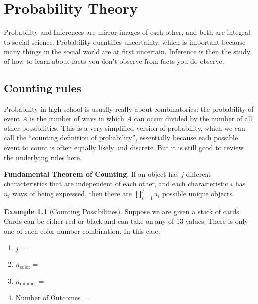 \documentclass[
]{book}
\theoremstyle{definition}
\theoremstyle{definition}
\newtheorem{example}{Example}[chapter]
\theoremstyle{definition}
\theoremstyle{definition}
\theoremstyle{remark}
\begin{document}
\hypertarget{probability-theory}{%
\chapter{Probability Theory}\label{probability-theory}}

Probability and Inferences are mirror images of each other, and both are integral to social science. Probability quantifies uncertainty, which is important because many things in the social world are at first uncertain. Inference is then the study of how to learn about facts you don't observe from facts you do observe.

\hypertarget{counting-rules}{%
\section{Counting rules}\label{counting-rules}}

Probability in high school is usually really about combinatorics: the probability of event \emph{A} is the number of ways in which \emph{A} can occur divided by the number of all other possibilities. This is a very simplified version of probability, which we can call the ``counting definition of probability'', essentially because each possible event to count is often equally likely and discrete. But it is still good to review the underlying rules here.

\textbf{Fundamental Theorem of Counting}: If an object has \(j\) different characteristics that are independent of each other, and each characteristic \(i\) has \(n_i\) ways of being expressed, then there are \(\prod_{i = 1}^j n_i\) possible unique objects.

\begin{example}[Counting Possibilities]
\protect\hypertarget{exm:countingrules}{}{\label{exm:countingrules} {} }
Suppose we are given a stack of cards. Cards can be either red or black and can take on any of 13 values. There is only one of each color-number combination. In this case,

\begin{enumerate}
\def\labelenumi{\arabic{enumi}.}
\item
  \(j =\)
\item
  \(n_{\text{color}} =\)
\item
  \(n_{\text{number}} =\)
\item
  Number of Outcomes \(=\)
\end{enumerate}
\end{example}
\end{document}
